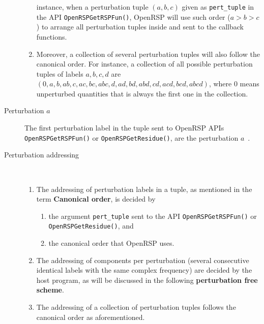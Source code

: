 \begin{description}
\begin{enumerate}
        instance, when a perturbation tuple $(a,b,c)$ given as
        \texttt{pert\_tuple} in the API \texttt{OpenRSPGetRSPFun()},
        OpenRSP will use such order ($a>b>c$) to arrange all perturbation
        tuples inside and sent to the callback functions.
      \item Moreover, a collection of several perturbation tuples will also
        follow the canonical order. For instance, a collection of all possible
        perturbation tuples of labels $a,b,c,d$ are
        $(0,a,b,ab,c,ac,bc,abc,d,ad,bd,abd,cd,acd,bcd,abcd)$, where $0$ means
        unperturbed quantities that is always the first one in the collection.
    \end{enumerate}
  \item[Perturbation $a$] The first perturbation label in the tuple sent to
    OpenRSP APIs \texttt{OpenRSPGetRSPFun()} or \texttt{OpenRSPGetResidue()},
    are the perturbation $a$~\cite{Thorvaldsen-JCP-129-214108}.
  \item[Perturbation addressing]~
    \begin{enumerate}
      \item The addressing of perturbation labels in a tuple, as mentioned in
        the term \textbf{Canonical order}, is decided by
        \begin{enumerate}
          \item the argument \texttt{pert\_tuple} sent to the API
            \texttt{OpenRSPGetRSPFun()} or \texttt{OpenRSPGetResidue()}, and
          \item the canonical order that OpenRSP uses.
        \end{enumerate}
      \item The addressing of components per perturbation (several consecutive
        identical labels with the same complex frequency) are decided by the
        host program, as will be discussed in the following
        \textbf{perturbation free scheme}.
      \item The addressing of a collection of perturbation tuples follows the
        canonical order as aforementioned.
    \end{enumerate}


\end{description}
